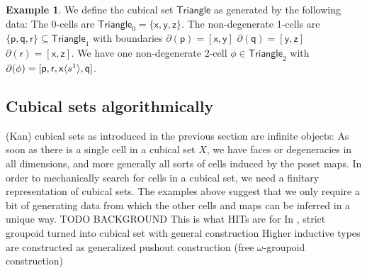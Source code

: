 \documentclass[11pt]{article}
\theoremstyle{definition}
\newtheorem{example}{Example}
\newcommand{\mlist}[1]{[ {#1} ]}
\newcommand{\smap}[1]{s^{{#1}}}
\newcommand{\dmap}[2]{d^{({#1} , {#2})}}
\newcommand{\cont}[2]{ \ifthenelse{\equal{#2}{}}{#1}{{#1}\langle{#2}\rangle} }
\newcommand{\cset}[1]{\mathsf{{#1}}}
\newcommand{\boundary}[1]{\partial({#1})}
\begin{document}
\begin{example}\label{exp:triangle}
  We define the cubical set $\cset{Triangle}$ as generated by the following
  data: The 0-cells are $\cset{Triangle}_0 = \{ \cset{x} , \cset{y} , \cset{z}
  \}$. The non-degenerate 1-cells are $\{ \cset{p} ,
  \cset{q} , \cset{r} \} \subseteq \cset{Triangle}_1$ with boundaries
  $\boundary{\cset{p}} = \mlist{ \cset{x} , \cset{y}}$
  $\boundary{\cset{q}} = \mlist{ \cset{y} , \cset{z}}$
  $\boundary{\cset{r}} = \mlist{ \cset{x} , \cset{z}}$.
  We have one non-degenerate 2-cell $\cset{\phi} \in \cset{Triangle}_2$ with
  $\boundary{\cset{\phi}} = \mlist{\cset{p} , \cset{r} , \cont{\cset{x}}{\smap{1}}  ,\cset{q}}$.
  

\end{example}






\subsection{Cubical sets algorithmically}

(Kan) cubical sets as introduced in the previous section are infinite objects:
As soon as there is a single cell in a cubical set $X$, we have faces or
degeneracies in all dimensions, and more generally all sorts of cells induced by
the poset maps. In order to mechanically search for cells in a cubical set, we
need a finitary representation of cubical sets. The examples above suggest that
we only require a bit of generating data from which the other cells and maps can
be inferred in a unique way. TODO BACKGROUND This is what HITs are for In
\cite[Sect. 6.4]{bezem14_model_type_theor_cubic_sets}, strict groupoid turned
into cubical set with general construction Higher inductive types are
constructed as generalized pushout construction (free $\omega$-groupoid
construction)
\end{document}
